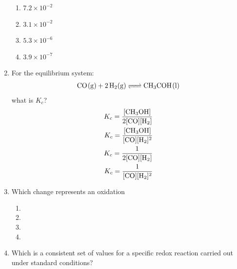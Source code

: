 \documentclass[11pt, leqno]{article}
\begin{document}
\begin{enumerate}[leftmargin = *]
\begin{enumerate}
    \item $7.2 \times 10 ^{-2}$
    \item $3.1\times 10^{-2}$
    \item $5.3 \times 10^{-6}$
    \item $3.9 \times 10^{-7}$
\end{enumerate}
\item For the equilibrium system:
\begin{align*}
    \ce{CO(g) + 2H2(g) <=> CH3COH(l)}
\end{align*}
what is $K_c$?
\begin{align}
K_c = \frac{[\ce{CH3OH}]}{2[\ce{CO}][\ce{H2}]} \\
K_c = \frac{[\ce{CH3OH}]}{[\ce{CO}][\ce{H2}]^2} \\
K_c = \frac{1}{2[\ce{CO}][\ce{H2}]} \\
K_c = \frac{1}{[\ce{CO}][\ce{H2}]^2} 
\end{align}
\item Which change represents an oxidation
\begin{enumerate}
    \item {}
    \item {}
    \item {}
    \item {}
\end{enumerate}
\item Which is a consistent set of values for a specific redox reaction carried out under standard conditions?


\end{enumerate}
\end{document}
